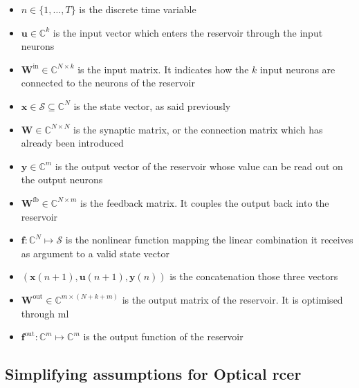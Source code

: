 \begin{itemize}
	\item $n \in \{1, \dots, T\}$ is the discrete time variable
	\item $\mathbf{u} \in \mathbb{C}^k$ is the input vector which enters the reservoir through the input neurons
	\item $\mathbf{W}^{\text{in}} \in \mathbb{C}^{N \times k}$ is the input matrix. It indicates how the $k$ input neurons are connected to the neurons of the reservoir
	\item $\mathbf{x} \in \mathcal{S} \subseteq \mathbb{C}^{N}$ is the state vector, as said previously
	\item $\mathbf{W} \in \mathbb{C}^{N \times N}$ is the synaptic matrix, or the connection matrix which has already been introduced
	\item $\mathbf{y} \in \mathbb{C}^{m}$ is the output vector of the reservoir whose value can be read out on the output neurons
	\item $\mathbf{W}^{\text{fb}} \in \mathbb{C}^{N \times m}$ is the feedback matrix. It couples the output back into the reservoir
	\item $\mathbf{f}: \mathbb{C}^N \mapsto \mathcal{S}$ is the nonlinear function mapping the linear combination it receives as argument to a valid state vector
	\item $\left(\mathbf{x}(n+1), \mathbf{u}(n+1), \mathbf{y}(n)\right)$ is the concatenation those three vectors
	\item $\mathbf{W}^{\text{out}} \in \mathbb{C}^{m \times (N+k+m)}$ is the output matrix of the reservoir. It is optimised through \gls{ml}
	\item $\mathbf{f}^{\text{out}} : \mathbb{C}^{m} \mapsto \mathbb{C}^{m}$ is the output function of the reservoir
\end{itemize}

\subsection{Simplifying assumptions for Optical \acrshort{rcer}}

